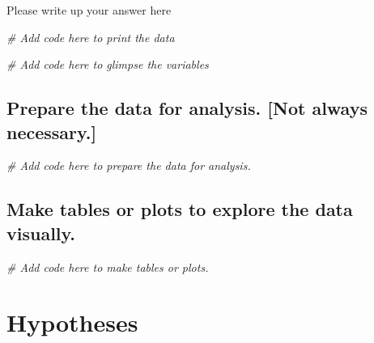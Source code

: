 \documentclass[
]{book}
\newenvironment{Shaded}{\begin{snugshade}}{\end{snugshade}}
\newcommand{\CommentTok}[1]{\textcolor[rgb]{0.56,0.35,0.01}{\textit{#1}}}
\begin{document}
Please write up your answer here

\begin{Shaded}
\begin{Highlighting}[]
\CommentTok{\# Add code here to print the data}
\end{Highlighting}
\end{Shaded}

\begin{Shaded}
\begin{Highlighting}[]
\CommentTok{\# Add code here to glimpse the variables}
\end{Highlighting}
\end{Shaded}

\hypertarget{prepare-the-data-for-analysis.-not-always-necessary.-3}{%
\subsection*{Prepare the data for analysis. {[}Not always necessary.{]}}\label{prepare-the-data-for-analysis.-not-always-necessary.-3}}

\begin{Shaded}
\begin{Highlighting}[]
\CommentTok{\# Add code here to prepare the data for analysis.}
\end{Highlighting}
\end{Shaded}

\hypertarget{make-tables-or-plots-to-explore-the-data-visually.-3}{%
\subsection*{Make tables or plots to explore the data visually.}\label{make-tables-or-plots-to-explore-the-data-visually.-3}}

\begin{Shaded}
\begin{Highlighting}[]
\CommentTok{\# Add code here to make tables or plots.}
\end{Highlighting}
\end{Shaded}

\hypertarget{hypotheses-3}{%
\section*{Hypotheses}\label{hypotheses-3}}
\end{document}
